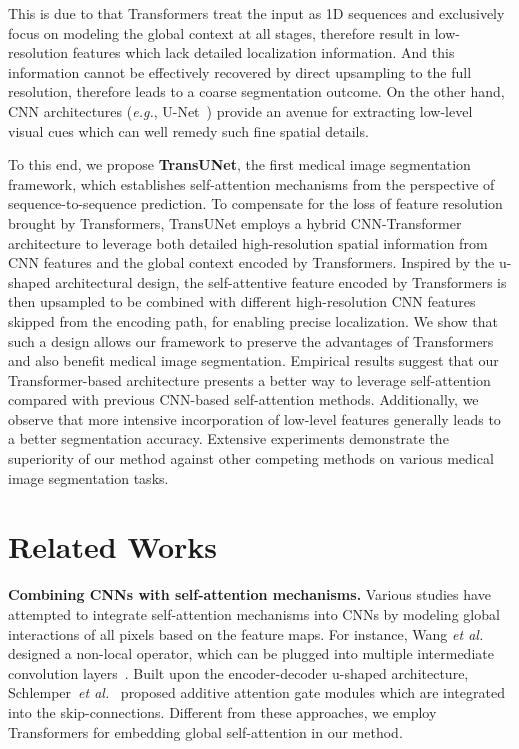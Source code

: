 \documentclass[runningheads]{llncs}
\begin{document}
This is due to that Transformers treat the input as 1D sequences and exclusively focus on modeling the global context at all stages, therefore result in low-resolution features which lack detailed localization information.
And this information cannot be effectively recovered by direct upsampling to the full resolution, therefore leads to a coarse segmentation outcome.
On the other hand, CNN architectures (\emph{e.g.}, U-Net~\cite{ronneberger2015u}) provide an avenue for extracting low-level visual cues which can well remedy such fine spatial details.

To this end, we propose \textbf{TransUNet}, the first medical image segmentation framework, which establishes self-attention mechanisms from the perspective of sequence-to-sequence prediction.
To compensate for the loss of feature resolution brought by Transformers, TransUNet employs a hybrid CNN-Transformer architecture to leverage both detailed high-resolution spatial information from CNN features and the global context encoded by Transformers.
Inspired by the u-shaped architectural design, the self-attentive feature encoded by Transformers is then upsampled to be combined with different high-resolution CNN features skipped from the encoding path, for enabling precise localization. We show that such a design allows our framework to preserve the advantages of Transformers and also benefit medical image segmentation. Empirical results suggest that our Transformer-based architecture presents a better way to leverage self-attention compared with previous CNN-based self-attention methods.
Additionally, we observe that more intensive incorporation of low-level features generally leads to a better segmentation accuracy. 
Extensive experiments demonstrate the superiority of our method against other competing methods on various medical image segmentation tasks.


\section{Related Works}
\noindent\textbf{Combining CNNs with self-attention mechanisms.}
Various studies have attempted to integrate self-attention mechanisms into CNNs by modeling global interactions of all pixels based on the feature maps. For instance, Wang \emph{et al.} designed a non-local operator, which can be plugged into multiple intermediate convolution layers~\cite{wang2018non}. Built upon the encoder-decoder u-shaped architecture, Schlemper~\emph{et al.}~\cite{schlemper2019attention} proposed additive attention gate modules which are integrated into the skip-connections.
Different from these approaches, we employ Transformers for embedding global self-attention in our method.
\end{document}
